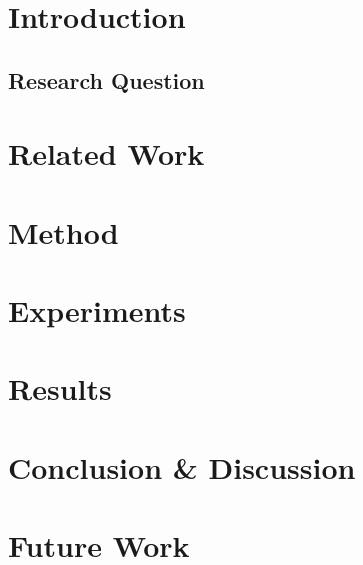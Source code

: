 \documentclass[11pt]{article}
\begin{document}
\listoftodos
\maketitle

\abstract
\tableofcontents
\newpage





\section{Introduction}

\subsection{Research Question}

\section{Related Work}



\section{Method}

\section{Experiments}

\section{Results}

\section{Conclusion \& Discussion}

\section{Future Work}

\appendix
\end{document}
